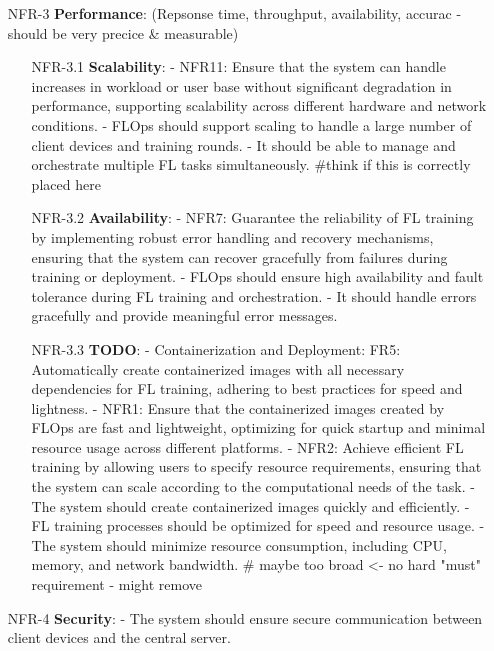\begin{itemize}
\begin{itemize}
        \end{itemize}
    \item [NFR-3] {\textbf{Performance}}: (Repsonse time, throughput, availability, accurac - should be very precice & measurable)
        \begin{itemize}
        \item [NFR-3.1] {\textbf{Scalability}}:
            - NFR11: Ensure that the system can handle increases in workload or user base without significant degradation in performance, supporting scalability across different hardware and network conditions.
            - FLOps should support scaling to handle a large number of client devices and training rounds.
            - It should be able to manage and orchestrate multiple FL tasks simultaneously. #think if this is correctly placed here
        \item [NFR-3.2] {\textbf{Availability}}: %
            - NFR7: Guarantee the reliability of FL training by implementing robust error handling and recovery mechanisms, ensuring that the system can recover gracefully from failures during training or deployment.
            - FLOps should ensure high availability and fault tolerance during FL training and orchestration.
            - It should handle errors gracefully and provide meaningful error messages.
        \item [NFR-3.3] {\textbf{TODO}}: %
            - Containerization and Deployment:
                FR5: Automatically create containerized images with all necessary dependencies for FL training, adhering to best practices for speed and lightness.
            - NFR1: Ensure that the containerized images created by FLOps are fast and lightweight, optimizing for quick startup and minimal resource usage across different platforms.
            - NFR2: Achieve efficient FL training by allowing users to specify resource requirements, ensuring that the system can scale according to the computational needs of the task.
            - The system should create containerized images quickly and efficiently.
            - FL training processes should be optimized for speed and resource usage.
            - The system should minimize resource consumption, including CPU, memory, and network bandwidth. # maybe too broad <- no hard "must" requirement - might remove
        \end{itemize}
    \item [NFR-4] {\textbf{Security}}:
        - The system should ensure secure communication between client devices and the central server.

\end{itemize}
